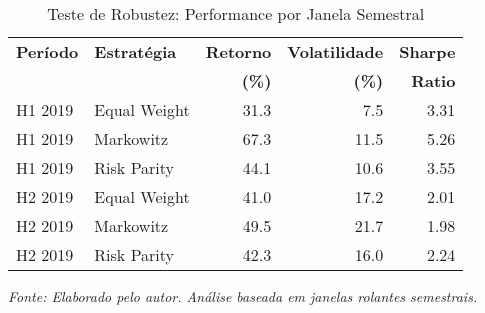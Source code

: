 \begin{table}[H]
\centering
\caption{Teste de Robustez: Performance por Janela Semestral}
\begin{tabular}{|l|l|r|r|r|}
\hline
\textbf{Período} & \textbf{Estratégia} & \textbf{Retorno} & \textbf{Volatilidade} & \textbf{Sharpe} \\
& & \textbf{(\%)} & \textbf{(\%)} & \textbf{Ratio} \\
\hline
H1 2019 & Equal Weight & 31.3 & 7.5 & 3.31 \\
H1 2019 & Markowitz & 67.3 & 11.5 & 5.26 \\
H1 2019 & Risk Parity & 44.1 & 10.6 & 3.55 \\
\hline
H2 2019 & Equal Weight & 41.0 & 17.2 & 2.01 \\
H2 2019 & Markowitz & 49.5 & 21.7 & 1.98 \\
H2 2019 & Risk Parity & 42.3 & 16.0 & 2.24 \\
\hline
\end{tabular}

\textit{Fonte: Elaborado pelo autor. Análise baseada em janelas rolantes semestrais.}
\label{tab:robustez_periodos}
\end{table}
